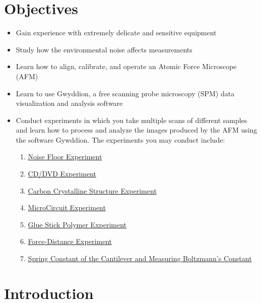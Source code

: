 \documentclass{../lab}
\begin{document}
\section{Objectives}

\begin{itemize}
    \item Gain experience with extremely delicate and sensitive equipment

    \item Study how the environmental noise affects measurements

    \item Learn how to align, calibrate, and operate an Atomic Force Microscope (AFM)

    \item Learn to use Gwyddion, a free scanning probe microscopy (SPM) data visualization and analysis software

    \item Conduct experiments in which you take multiple scans of different samples and learn how to process and analyze the images produced by the AFM using the software Gywddion. The experiments you may conduct include:

\begin{enumerate}

\item \hyperref[subsec:NoiseFloor]{Noise Floor Experiment}

\item \hyperref[subsec:CD/DVD]{CD/DVD Experiment}

\item \hyperref[subsec:CarbonCrystal]{Carbon Crystalline Structure Experiment}

\item \hyperref[subsec:Microcircuit]{MicroCircuit Experiment}

\item \hyperref[subsec:GlueStick]{Glue Stick Polymer Experiment}

\item \hyperref[subsec:ForceDistance]{Force-Distance Experiment}

\item \hyperref[subsec:Boltzmann]{Spring Constant of the Cantilever and Measuring Boltzmann's Constant}

\end{enumerate}

\end{itemize}

\section{Introduction}
\end{document}
